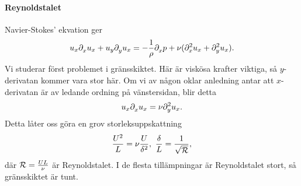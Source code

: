 \paragraph{Reynoldstalet}
Navier-Stokes' ekvation ger
\begin{align*}
	u_{x}\del{x}{u_{x}} + u_{y}\del{y}{u_{x}} = -\frac{1}{\rho}\del{x}{p} + \nu(\del[2]{x}{u_{x}} + \del[2]{y}{u_{x}}).
\end{align*}
Vi studerar först problemet i gränsskiktet. Här är viskösa krafter viktiga, så $y$-derivatan kommer vara stor här. Om vi av någon oklar anledning antar att $x$-derivatan är av ledande ordning på vänstersidan, blir detta
\begin{align*}
	u_{x}\del{x}{u_{x}} = \nu\del[2]{y}{u_{x}}.
\end{align*}
Detta låter oss göra en grov storleksuppskattning
\begin{align*}
	\frac{U^{2}}{L} = \nu\frac{U}{\delta^{2}},\ \frac{\delta}{L} = \frac{1}{\sqrt{\rey}},
\end{align*}
där $\rey = \frac{UL}{\nu}$ är Reynoldstalet. I de flesta tillämpningar är Reynoldstalet stort, så gränsskiktet är tunt.

